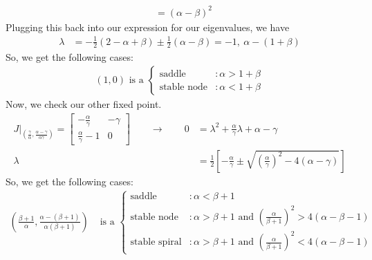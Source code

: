 \documentclass[10pt,letterpaper]{report}
\newcommand{\so}{\qquad \rightarrow \qquad}
\newcommand{\mtx}[2]{\left[\begin{array}{#1}#2\end{array}\right]}
\begin{document}
\begin{enumerate}
\begin{enumerate}
\begin{align*}
        &= (\alpha - \beta)^2
    \end{align*}
    Plugging this back into our expression for our eigenvalues, we have
    \begin{align*}
        \lambda &= -\frac{1}{2}\left(2 - \alpha + \beta\right) \pm \frac{1}{2}(\alpha - \beta) = -1,\ \alpha - (1 + \beta)
    \end{align*}
    So, we get the following cases:
    \begin{align*}
        (1, 0) \textrm{ is a } \begin{cases}
        \textrm{saddle} &: \alpha > 1 + \beta \\
        \textrm{stable node} &: \alpha < 1 + \beta
        \end{cases}
    \end{align*}
    Now, we check our other fixed point. 
    \begin{align*}
        J\bigg\vert_{\left(\frac{\gamma}{\alpha},\frac{\alpha - \gamma}{\alpha\gamma} \right)} = \mtx{cc}{-\frac{\alpha}{\gamma} & -\gamma \\ \frac{\alpha}{\gamma} - 1 & 0}
        \so
        0 &= \lambda^2 +\frac{\alpha}{\gamma}\lambda + \alpha - \gamma
        \\
        \lambda &= \frac{1}{2}\left[-\frac{\alpha}{\gamma} \pm \sqrt{\left(\frac{\alpha}{\gamma}\right)^2 - 4(\alpha - \gamma)}\right]
    \end{align*}
    So, we get the following cases:
    \begin{align*}
        \left(\frac{\beta + 1}{\alpha},\frac{\alpha - (\beta + 1)}{\alpha(\beta + 1)} \right) &\textrm{ is a }
        \begin{cases}
        \textrm{saddle} &: \alpha < \beta + 1 \\
        \textrm{stable node} &: \alpha > \beta + 1 \textrm{ and } \left(\frac{\alpha}{\beta + 1}\right)^2 > 4(\alpha - \beta - 1)
         \\
        \textrm{stable spiral} &: \alpha > \beta + 1 \textrm{ and } \left(\frac{\alpha}{\beta + 1}\right)^2 < 4(\alpha - \beta - 1)
        \end{cases}
    \end{align*}
    

\end{enumerate}
\end{enumerate}
\end{document}

